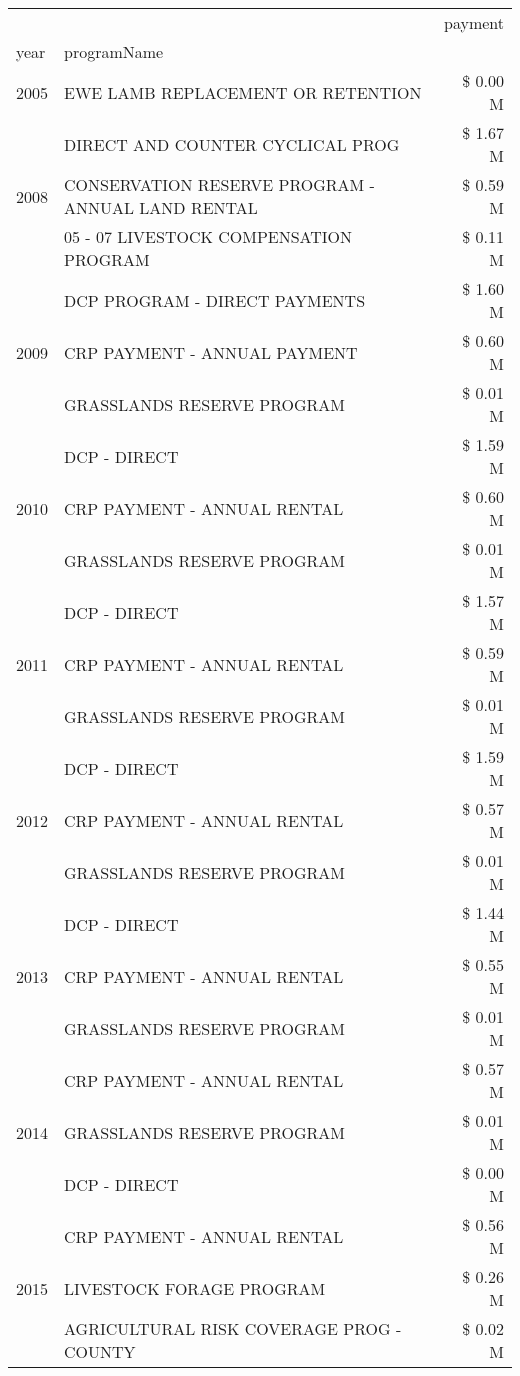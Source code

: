 \begin{tabular}{llr}
\toprule
 &  & payment \\
year & programName &  \\
\midrule
2005 & EWE LAMB REPLACEMENT OR RETENTION & \$ 0.00 M \\
\cline{1-3}
\multirow[t]{3}{*}{2008} & DIRECT AND COUNTER CYCLICAL PROG & \$ 1.67 M \\
 & CONSERVATION RESERVE PROGRAM - ANNUAL LAND RENTAL & \$ 0.59 M \\
 & 05 - 07 LIVESTOCK COMPENSATION PROGRAM & \$ 0.11 M \\
\cline{1-3}
\multirow[t]{3}{*}{2009} & DCP PROGRAM - DIRECT PAYMENTS & \$ 1.60 M \\
 & CRP PAYMENT - ANNUAL PAYMENT & \$ 0.60 M \\
 & GRASSLANDS RESERVE PROGRAM & \$ 0.01 M \\
\cline{1-3}
\multirow[t]{3}{*}{2010} & DCP - DIRECT & \$ 1.59 M \\
 & CRP PAYMENT - ANNUAL RENTAL & \$ 0.60 M \\
 & GRASSLANDS RESERVE PROGRAM & \$ 0.01 M \\
\cline{1-3}
\multirow[t]{3}{*}{2011} & DCP - DIRECT & \$ 1.57 M \\
 & CRP PAYMENT - ANNUAL RENTAL & \$ 0.59 M \\
 & GRASSLANDS RESERVE PROGRAM & \$ 0.01 M \\
\cline{1-3}
\multirow[t]{3}{*}{2012} & DCP - DIRECT & \$ 1.59 M \\
 & CRP PAYMENT - ANNUAL RENTAL & \$ 0.57 M \\
 & GRASSLANDS RESERVE PROGRAM & \$ 0.01 M \\
\cline{1-3}
\multirow[t]{3}{*}{2013} & DCP - DIRECT & \$ 1.44 M \\
 & CRP PAYMENT - ANNUAL RENTAL & \$ 0.55 M \\
 & GRASSLANDS RESERVE PROGRAM & \$ 0.01 M \\
\cline{1-3}
\multirow[t]{3}{*}{2014} & CRP PAYMENT - ANNUAL RENTAL & \$ 0.57 M \\
 & GRASSLANDS RESERVE PROGRAM & \$ 0.01 M \\
 & DCP - DIRECT & \$ 0.00 M \\
\cline{1-3}
\multirow[t]{3}{*}{2015} & CRP PAYMENT - ANNUAL RENTAL & \$ 0.56 M \\
 & LIVESTOCK FORAGE PROGRAM & \$ 0.26 M \\
 & AGRICULTURAL RISK COVERAGE PROG - COUNTY & \$ 0.02 M \\

\end{tabular}
